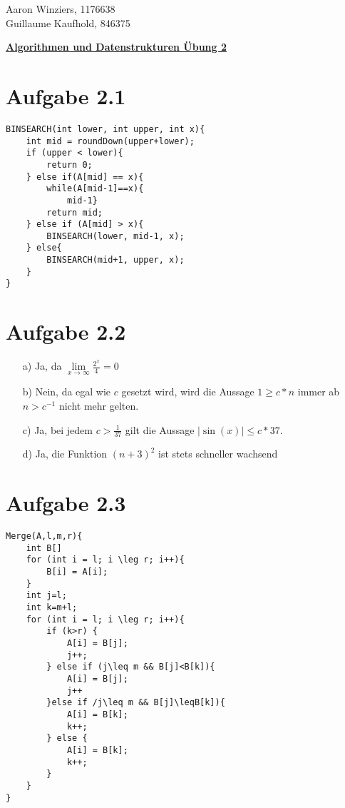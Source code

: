 \documentclass[10pt,a4paper]{article}
\begin{document}
	\begin{flushright}
		Aaron Winziers, 1176638	\\
		Guillaume Kaufhold, 846375
	\end{flushright}
	\begin{center}
		\underline{\textbf{Algorithmen und Datenstrukturen Übung 2}}
	\end{center}
	\section{Aufgabe 2.1}
	\begin{lstlisting}
BINSEARCH(int lower, int upper, int x){
	int mid = roundDown(upper+lower);
	if (upper < lower){
		return 0;
	} else if(A[mid] == x){
		while(A[mid-1]==x){
			mid-1}
		return mid;
	} else if (A[mid] > x){
		BINSEARCH(lower, mid-1, x);
	} else{
		BINSEARCH(mid+1, upper, x);
	}
}
	\end{lstlisting}
	\section{Aufgabe 2.2}
	\begin{itemize}
		\item[a)] Ja, da $\lim\limits_{x\rightarrow\infty}\frac{2^{x}}{4^{}}=0$
		\item[b)] Nein, da egal wie $c$ gesetzt wird, wird die Aussage $1\geq c*n$ immer ab $n>c^{-1}$ nicht mehr gelten.
		\item[c)] Ja, bei jedem $c>\frac{1}{37}$ gilt die Aussage $|\sin(x)|\leq c*37$.
		\item[d)] Ja, die Funktion $(n+3)^{2}$ ist stets schneller wachsend
	\end{itemize}

	\section{Aufgabe 2.3}
	\begin{lstlisting}
Merge(A,l,m,r){
	int B[]
	for (int i = l; i \leg r; i++){
		B[i] = A[i];	
	}
	int j=l;
	int k=m+l;
	for (int i = l; i \leg r; i++){
		if (k>r) {
			A[i] = B[j];
			j++;
		} else if (j\leq m && B[j]<B[k]){
			A[i] = B[j];
			j++
		}else if /j\leq m && B[j]\leqB[k]){
			A[i] = B[k];
			k++;
		} else {
			A[i] = B[k];
			k++;
		}
	}
}
	\end{lstlisting}
	
	
	
	
	
	
	
	
	
	
	
	
	
	
	
	
	
	
	
	
	
	
	
	
	
	
	
\end{document}
